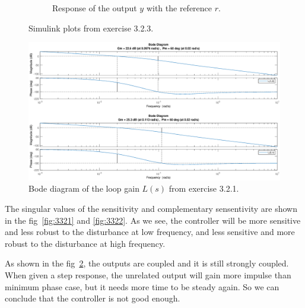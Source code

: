 \documentclass[11pt,a4paper]{article}
\begin{document}
\begin{figure}[!ht]
\begin{subfigure}[t]{.495\linewidth}
		\caption{Response of the output $y$ with the reference $r$.}
		\label{fig:3332}
	\end{subfigure}
	\caption{Simulink plots from exercise 3.2.3.}
	\label{fig:NMPSimulink}
\end{figure}
\begin{figure}[!ht]
	\footnotesize
	\centering 
	\includegraphics[width=\textwidth]{331}
	\caption{Bode diagram of the loop gain $L(s)$ from exercise 3.2.1.}
	\label{fig:NMPBodeL}
\end{figure}

\par The singular values of the sensitivity and complementary sensentivity are shown in the fig~\ref{fig:3321} and \ref{fig:3322}. As we see, the controller will be more sensitive and less robust to the disturbance at low frequency, and less sensitive and more robust to the disturbance at high frequency.

\par As shown in the fig~\ref{fig:NMPSimulink}, the outputs are coupled and it is still strongly coupled. When given a step response, the unrelated output will gain more impulse than minimum phase case, but it needs more time to be steady again. So we can conclude that the controller is not good enough.
\end{document}
